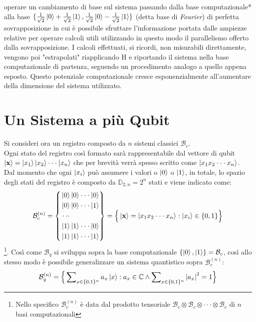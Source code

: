 \documentclass[12pt,a4paper,openright]{report}
\begin{document}
operare un cambiamento di base \cite{ref8} sul sistema passando dalla base computazionale* alla base $\{\frac{1}{\sqrt2}\ket0 + \frac{1}{\sqrt2}\ket1, \frac{1}{\sqrt2}\ket0 - \frac{1}{\sqrt2}\ket1\}$ (detta base di \emph{Fourier}) di
perfetta sovrapposizione in cui è possibile sfruttare l'informazione portata dalle ampiezze relative per operare calcoli utili utilizzando in questo modo il parallelismo offerto dalla sovrapposizione. I calcoli effettuati,
si ricordi, non misurabili direttamente, vengono poi "estrapolati" riapplicando H e riportando il sistema nella base computazionale di partenza, seguendo un procedimento analogo a quello appena esposto.
Questo potenziale computazionale cresce esponenzialmente all'aumentare della dimensione del sistema utilizzato.

\section{Un Sistema a più Qubit}
Si consideri ora un registro composto da $n$ sistemi classici $\mathcal{B}_c$.\\
Ogni stato del registro così formato sarà rappresentabile dal vettore di qubit $\ket{\textbf{x}}= \ket{x_1}\ket{x_2}\cdot\cdot\cdot\ket{x_n}$ che per brevità verrà spesso scritto come $\ket{x_1 x_2 \cdot\cdot\cdot x_n}$.
Dal momento che ogni $\ket{x_i}$ può assumere i valori o $\ket0$ o $\ket1$, in totale, lo spazio degli stati del registro è composto da $\mathbb{D}_{2,n}=2^n$ stati e viene indicato come:
\begin{equation*}
    \mathcal{B}_c^{(n)} = \left\{ 
    \begin{aligned}
        & \ket0 \ket0 \cdot \cdot \cdot \ket0 \\
        & \ket0 \ket0 \cdot \cdot \cdot \ket1 \\
        & \cdot\cdot\cdot \\
        & \ket1 \ket1 \cdot \cdot \cdot \ket0 \\
        & \ket1 \ket1 \cdot \cdot \cdot \ket1
    \end{aligned}
    \right\} = \Big\{\ket{\textbf{x}}=\ket{x_1 x_2 \cdot \cdot \cdot x_n} : \ket{x_i} \in \{0,1\} \Big\}
\end{equation*}
\footnote{Nello specifico $\mathcal{B}_c^{(n)}$ è data dal prodotto tensoriale $\mathcal{B}_c \otimes \mathcal{B}_c \otimes \cdot\cdot\cdot \otimes \mathcal{B}_c$ di $n$ basi computazionali }. Così come $\mathcal{B}_q$ si sviluppa sopra la base computazionale $\{\ket0, \ket1 \}= \mathcal{B}_c$, così allo stesso modo è possibile generalizzare un sistema quantistico sopra $\mathcal{B}_c^{(n)}$:
\[
    \mathcal{B}_q^{(n)} = \Big\{ \sum\nolimits_{x \in \{0,1\}^{n}} a_x \ket{x} : a_x \in \mathbb{C} \land \sum\nolimits_{x\in\{0,1\}^{n}} {\left\vert{a_x}\right\vert}^2 = 1\Big\}
\]
\end{document}
